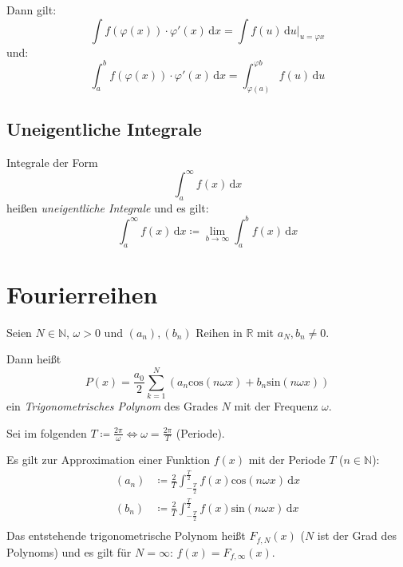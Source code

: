 \documentclass[a4paper, 11pt, accentcolor = tud3b]{tudreport}
\begin{document}
                    Dann gilt:
                    \begin{equation*}
                        \int \! f(\varphi(x)) \cdot \varphi'(x) \, \mathrm{d}x = \int \! f(u) \, \mathrm{d}u \Bigr| _ { u = \varphi{x} }
                    \end{equation*}
                    und:
                    \begin{equation*}
                        \int _ a ^ b \! f(\varphi(x)) \cdot \varphi'(x) \, \mathrm{d}x = \int _ { \varphi(a) } ^ { \varphi{b} } \! f(u) \, \mathrm{d}u
                    \end{equation*}

            \subsection{Uneigentliche Integrale}
                Integrale der Form \[ \int _ a ^ \infty \! f(x) \, \mathrm{d}x \] heißen \textit{uneigentliche Integrale} und es gilt:
                \begin{equation*}
                    \int _ a ^ \infty \! f(x) \, \mathrm{d}x \coloneqq \lim _ { b \rightarrow \infty } \int _ a ^ b \! f(x) \, \mathrm{d}x
                \end{equation*}

        \section{Fourierreihen}
            Seien $ N \in \mathbb{N} $, $ \omega > 0 $ und $ (a _ n), (b _ n) $ Reihen in $ \mathbb{R} $ mit $ a _ N, b _ n \neq 0 $.

            Dann heißt \[ P(x) = \frac{a _ 0}{2} \sum _ { k = 1 } ^ N (a _ n \text{cos}(n \omega x) + b _ n \text{sin}(n \omega x)) \] ein \textit{Trigonometrisches Polynom} des Grades $ N $ mit der Frequenz $ \omega $.

            Sei im folgenden $ T \coloneqq \frac{2\pi}{\omega} \iff \omega = \frac{2\pi}{T} $ (Periode).

            Es gilt zur Approximation einer Funktion $ f(x) $ mit der Periode $ T $ ($ n \in \mathbb{N} $):
            \begin{align*}
                (a _ n) &\coloneqq \frac{2}{T} \int _ { - \frac{T}{2} } ^ \frac{T}{2} \! f(x) \text{cos}(n \omega x) \, \mathrm{d}x \\
                (b _ n) &\coloneqq \frac{2}{T} \int _ { - \frac{T}{2} } ^ \frac{T}{2} \! f(x) \text{sin}(n \omega x) \, \mathrm{d}x \\
            \end{align*}
            Das entstehende trigonometrische Polynom heißt $ F _ { f, N } (x) $ ($ N $ ist der Grad des Polynoms) und es gilt für $ N = \infty $: $ f(x) = F _ { f, \infty } (x) $.
\end{document}
